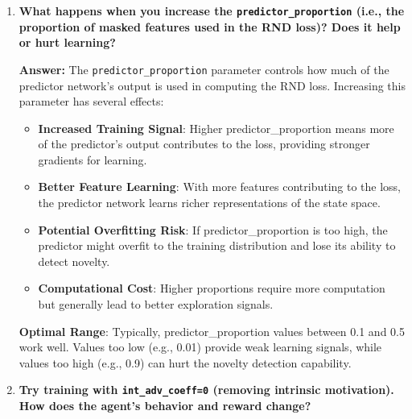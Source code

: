 \documentclass[12pt]{article}
\begin{document}
{{{\begin{itemize}[noitemsep]
\begin{enumerate}
\begin{itemize}
        \item \textbf{Risk Mitigation}: In environments with sparse rewards, intrinsic motivation prevents the agent from becoming completely random or inactive.
    \end{itemize}
    
    The combined return $R_{total} = R_{extrinsic} + \beta \cdot R_{intrinsic}$ ensures that the agent learns both to solve the task (extrinsic) and to explore effectively (intrinsic).
    
    \item \textbf{What happens when you increase the \texttt{predictor\_proportion} (i.e., the proportion of masked features used in the RND loss)? Does it help or hurt learning?}
    
    \textbf{Answer:} The \texttt{predictor\_proportion} parameter controls how much of the predictor network's output is used in computing the RND loss. Increasing this parameter has several effects:
    
    \begin{itemize}
        \item \textbf{Increased Training Signal}: Higher predictor\_proportion means more of the predictor's output contributes to the loss, providing stronger gradients for learning.
        
        \item \textbf{Better Feature Learning}: With more features contributing to the loss, the predictor network learns richer representations of the state space.
        
        \item \textbf{Potential Overfitting Risk}: If predictor\_proportion is too high, the predictor might overfit to the training distribution and lose its ability to detect novelty.
        
        \item \textbf{Computational Cost}: Higher proportions require more computation but generally lead to better exploration signals.
    \end{itemize}
    
    \textbf{Optimal Range}: Typically, predictor\_proportion values between 0.1 and 0.5 work well. Values too low (e.g., 0.01) provide weak learning signals, while values too high (e.g., 0.9) can hurt the novelty detection capability.
    
    \item \textbf{Try training with \texttt{int\_adv\_coeff=0} (removing intrinsic motivation). How does the agent's behavior and reward change?}
    

\end{enumerate}
\end{itemize}}}}
\end{document}
